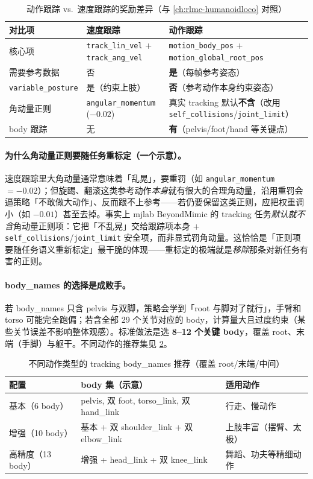 \begin{table}[ht]
\centering
\small
\caption{动作跟踪 vs.\ 速度跟踪的奖励差异（与 \cref{ch:rlmc-humanoidloco} 对照）}
\label{tab:rlmc-mi-rewdiff}
\begin{tabular}{@{}lll@{}}
\toprule
对比项 & 速度跟踪 & 动作跟踪 \\
\midrule
核心项 & \verb|track_lin_vel| + \verb|track_ang_vel| & \verb|motion_body_pos| + \verb|motion_global_root_pos| \\
需要参考数据 & 否 & \textbf{是}（每帧参考姿态） \\
\verb|variable_posture| & 是（约束上肢） & \textbf{否}（参考动作本身约束姿态） \\
角动量正则 & \verb|angular_momentum| ($-0.02$) & 真实 tracking 默认\textbf{不含}（改用 \verb|self_collisions|/\verb|joint_limit|） \\
body 跟踪 & 无 & \textbf{有}（pelvis/foot/hand 等关键点） \\
\bottomrule
\end{tabular}
\end{table}

\paragraph{为什么角动量正则要随任务重标定（一个示意）。}速度跟踪里大角动量通常意味着「乱晃」，要重罚（如 \verb|angular_momentum| $=-0.02$）；但旋踢、翻滚这类参考动作\emph{本身}就有很大的合理角动量，沿用重罚会逼策略「不敢做大动作」、反而跟不上参考——若仍要保留这类正则，应把权重调小（如 $-0.01$）甚至去掉。事实上 mjlab BeyondMimic 的 tracking 任务\emph{默认就不含}角动量正则项：它把「不乱晃」交给跟踪项本身 $+$ \verb|self_collisions|/\verb|joint_limit| 安全项，而非显式罚角动量。这恰恰是「正则项要随任务语义重新标定」最干脆的体现——重标定的极端就是\emph{移除}那条对新任务有害的正则。

\paragraph{body\_names 的选择是成败手。}若 body\_names 只含 pelvis 与双脚，策略会学到「root 与脚对了就行」，手臂和 torso 可能完全跑偏；若含全部 29 个关节对应的 body，计算量大且过度约束（某些关节误差不影响整体观感）。标准做法是选 \textbf{8--12 个关键 body}，覆盖 root、末端（手脚）与躯干。不同动作的推荐集见 \cref{tab:rlmc-mi-bodysel}。

\begin{table}[ht]
\centering
\small
\caption{不同动作类型的 tracking body\_names 推荐（覆盖 root/末端/中间）}
\label{tab:rlmc-mi-bodysel}
\begin{tabular}{@{}lll@{}}
\toprule
配置 & body 集（示意） & 适用动作 \\
\midrule
基本（6 body） & pelvis, 双 foot, torso\_link, 双 hand\_link & 行走、慢动作 \\
增强（10 body） & 基本 + 双 shoulder\_link + 双 elbow\_link & 上肢丰富（摆臂、太极） \\
高精度（13 body） & 增强 + head\_link + 双 knee\_link & 舞蹈、功夫等精细动作 \\
\bottomrule
\end{tabular}
\end{table}

